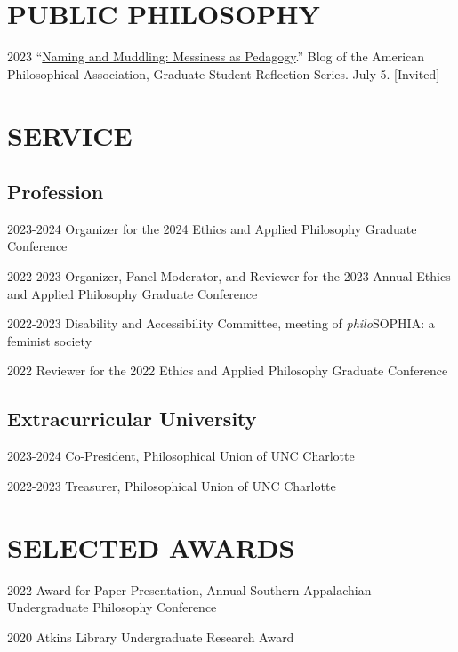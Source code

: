 \documentclass{article}
\begin{document}
\section*{\normalsize{PUBLIC PHILOSOPHY}}
\begin{tablist}
    \item[2023] \tab{}\enquote{\href{https://blog.apaonline.org/2023/07/05/naming-and-muddling-messiness-as-pedagogy/}{Naming and Muddling: Messiness as Pedagogy}.} Blog of the American Philosophical Association, Graduate Student Reflection Series. July 5. [Invited]
\end{tablist}

\section*{\normalsize{SERVICE}}
\subsection*{\normalsize{Profession}}
\begin{tablist}
    \item[2023-2024] \tab{}Organizer for the 2024 Ethics and Applied Philosophy Graduate Conference
    \item[2022-2023] \tab{}Organizer, Panel Moderator, and Reviewer for the 2023 Annual Ethics and Applied Philosophy Graduate Conference
    \item[2022-2023] \tab{}Disability and Accessibility Committee,  meeting of \textit{philo}SOPHIA: a feminist society 
    \item[2022] \tab{}Reviewer for the 2022 Ethics and Applied Philosophy Graduate Conference
\end{tablist}
\subsection*{\normalsize{Extracurricular University}}
\begin{tablist}
    \item[2023-2024] \tab{}Co-President, Philosophical Union of UNC Charlotte
    \item[2022-2023] \tab{}Treasurer, Philosophical Union of UNC Charlotte
\end{tablist}

\section*{\normalsize{SELECTED AWARDS}}
\begin{tablist}
    \item[2022] \tab{}Award for Paper Presentation,  Annual Southern Appalachian Undergraduate Philosophy Conference
    \item[2020] \tab{}Atkins Library Undergraduate Research Award
\end{tablist}
\end{document}

